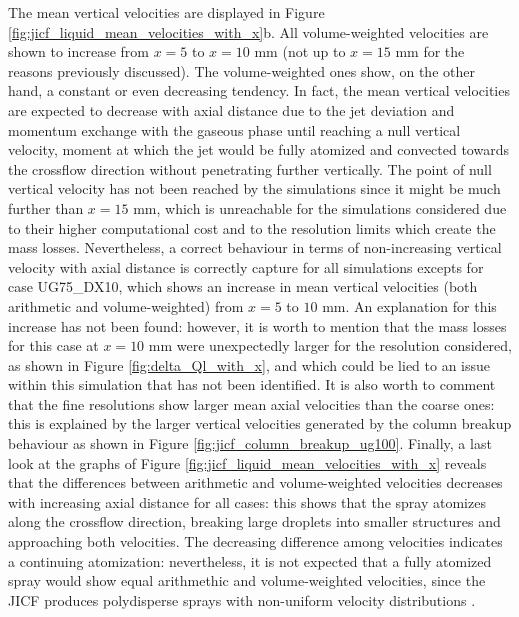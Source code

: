 The mean vertical velocities are displayed in Figure \ref{fig:jicf_liquid_mean_velocities_with_x}b. All volume-weighted velocities are shown to increase from $x = 5$ to $x = 10$ mm (not up to $x = 15$ mm for the reasons previously discussed). The volume-weighted ones show, on the other hand, a constant or even decreasing tendency. In fact, the mean vertical velocities are expected to decrease with axial distance due to the jet deviation and momentum exchange with the gaseous phase until reaching a null vertical velocity, moment at which the jet would be fully atomized and convected towards the crossflow direction without penetrating further vertically. The point of null vertical velocity has not been reached by the simulations since it might be much further than $x = 15$ mm, which is unreachable for the simulations considered due to their higher computational cost and to the resolution limits which create the mass losses. Nevertheless, a correct behaviour in terms of non-increasing vertical velocity with axial distance is correctly capture for all simulations excepts for case UG75\_DX10, which shows an increase in mean vertical velocities (both arithmetic and volume-weighted) from $x = 5$ to $10$ mm. An explanation for this increase has not been found: however, it is worth to mention that the mass losses for this case at $x = 10$ mm were unexpectedly larger for the resolution considered, as shown in Figure \ref{fig:delta_Ql_with_x}, and which could be lied to an issue within this simulation that has not been identified. It is also worth to comment that the fine resolutions show larger mean axial velocities than the coarse ones: this is explained by the larger vertical velocities generated by the column breakup behaviour as shown in Figure \ref{fig:jicf_column_breakup_ug100}. Finally, a last look at the graphs of Figure \ref{fig:jicf_liquid_mean_velocities_with_x} reveals that the differences between arithmetic and volume-weighted velocities decreases with increasing axial distance for all cases: this shows that the spray atomizes along the crossflow direction, breaking large droplets into smaller structures and approaching both velocities. The decreasing difference among velocities indicates a continuing atomization: nevertheless, it is not expected that a fully atomized spray would show equal arithmethic and volume-weighted velocities, since the JICF produces polydisperse sprays with non-uniform velocity distributions \citepColor[wu_spray_1998].



